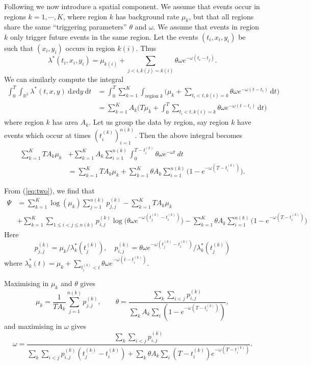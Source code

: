\documentclass[twoside,a4paper]{article}
\theoremstyle{plain}
\theoremstyle{definition}
\newcommand{\rd}{\textrm{d}}
\begin{document}
Following \cite[Section~2.2]{sepp2} we now introduce a spatial component.
We assume that events occur in regions $k=1,\cdots,K$, where region $k$ has background rate
$\mu_k$, but that all regions share the same ``triggering parameters'' $\theta$ and $\omega$.
We assume that events in region $k$ only trigger future events in the same region.
Let the events $(t_i, x_i, y_i)$ be such that $(x_i,y_i)$ occurs in region $k(i)$.  Thus
\[ \lambda^*(t_i,x_i,y_i) = \mu_{k(i)} + \sum_{j<i, k(j)=k(i)} \theta \omega e^{-\omega(t_i-t_j)}. \]
We can similarly compute the integral
\begin{align*}
\int_0^T \int_{\mathbb R^2} \lambda^*(t,x,y) \ \rd x \rd y \ \rd t
&= \int_0^T \sum_{k=1}^K \int_{\text{region }k} \Big( \mu_k + \sum_{t_i < t, k(i)=k}
   \theta \omega e^{-\omega(t-t_i)} \ \rd t \Big) \\
&= \sum_{k=1}^K A_k \Big( T\mu_k + \int_0^T \sum_{t_i < t, k(i)=k}
   \theta \omega e^{-\omega(t-t_i)} \ \rd t \Big)
\end{align*}
where region $k$ has area $A_k$.  Let us group the data by region, say
region $k$ have events which occur at times $(t^{(k)}_i)_{i=1}^{n(k)}$.  Then the
above integral becomes
\begin{align*} \sum_{k=1}^K TA_k\mu_k &+ \sum_{k=1}^K A_k \sum_{i=1}^{n(k)}
\int_0^{T-t^{(k)}_i} \theta\omega e^{-\omega t} \ dt \\
&= \sum_{k=1}^K TA_k\mu_k + \sum_{k=1}^K \theta A_k \sum_{i=1}^{n(k)}
\big( 1 - e^{-\omega (T-t^{(k)}_i)} \big).
\end{align*}

From (\ref{eq:two}), we find that
\begin{align*} \Psi &=
\sum_{k=1}^K \log(\mu_k) \sum_{j=1}^{n(k)} p^{(k)}_{j,j} - \sum_{k=1}^K TA_k\mu_k\\
&+ \sum_{k=1}^K \sum_{1\leq i<j\leq n(k)} p^{(k)}_{i,j} \log\big( \theta\omega
  e^{-\omega(t^{(k)}_j - t^{(k)}_i)} \big) - \sum_{k=1}^K \theta A_k \sum_{i=1}^{n(k)}
\big( 1 - e^{-\omega (T-t^{(k)}_i)} \big)
\end{align*}
Here
\[ p^{(k)}_{j,j} = \mu_k / \lambda^*_k(t^{(k)}_j), \quad
p^{(k)}_{i,j} = \theta\omega e^{-\omega(t^{(k)}_j - t^{(k)}_i)} / \lambda^*_k(t^{(k)}_j)
\]
where $\lambda^*_k(t) = \mu_k + \sum_{t^{(k)}_i<t} \theta\omega e^{-\omega(t-t^{(k)}_i)}$.

Maximising in $\mu_k$ and $\theta$ gives
\[ \mu_k = \frac{1}{T A_k} \sum_{j=1}^{n(k)} p^{(k)}_{j,j},
\qquad
\theta = \frac{\sum_k \sum_{i<j} p^{(k)}_{i,j}}{\sum_k A_k \sum_i (1-e^{-\omega(T-t^{(k)}_i)})},
\]
and maximising in $\omega$ gives
\[ \omega = \frac{\sum_k \sum_{i<j} p^{(k)}_{i,j}}{
\sum_k \sum_{i<j} p^{(k)}_{i,j} (t^{(k)}_j - t^{(k)}_i)
+ \sum_k \theta A_k \sum_i (T-t^{(k)}_i) e^{-\omega(T-t^{(k)}_i)}
}. \]
\end{document}
